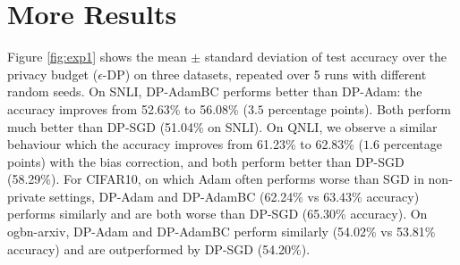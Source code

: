 \documentclass[letterpaper]{article} %
\begin{document}
\begin{table}[tb]
\centering
\renewcommand{\arraystretch}{1.1}
\caption{Empirically measured values for deviance of the observed DP bias from $\Phi$.}
\label{tab:empirical_bound}
\end{table}

\section{More Results}
\label{apdix:more_res}

Figure \ref{fig:exp1} shows the mean $\pm$ standard deviation of test accuracy over the privacy budget ($\epsilon$-DP) on three datasets, repeated over 5 runs with different random seeds.
On SNLI, DP-AdamBC performs better than DP-Adam: the accuracy improves from 52.63\% to 56.08\% ($3.5$ percentage points). Both perform much better than DP-SGD (51.04\% on SNLI).
On QNLI, we observe a similar behaviour which the accuracy improves from 61.23\% to 62.83\% ($1.6$ percentage points) with the bias correction, and both perform better than DP-SGD (58.29\%).
For CIFAR10, on which Adam often performs worse than SGD in non-private settings, DP-Adam and DP-AdamBC (62.24\% vs 63.43\% accuracy) performs similarly and are both worse than DP-SGD (65.30\% accuracy).
On ogbn-arxiv, DP-Adam and DP-AdamBC perform similarly (54.02\% vs 53.81\% accuracy) and are outperformed by DP-SGD (54.20\%).
\end{document}
